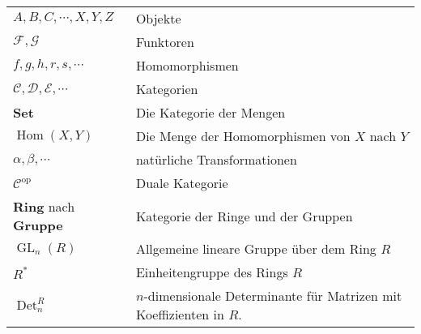 \documentclass[a4paper]{amsart}
\theoremstyle{definition}
\DeclareMathOperator{\Det}{Det}
\DeclareMathOperator{\Hom}{Hom}
\DeclareMathOperator{\GL}{GL}
\begin{document}
\begin{tabular}{ll}
    $A, B, C, \cdots, X, Y, Z$          & Objekte\\
    $\mathcal F,\mathcal G$             & Funktoren\\
    $f, g, h, r, s, \cdots$             & Homomorphismen\\
    $\mathcal C, \mathcal D, \mathcal E, \cdots$ & Kategorien\\
    \textbf{Set}                        & Die Kategorie der Mengen\\
    $\Hom( X, Y)$                       & Die Menge der Homomorphismen von $X$ nach $Y$\\
    $\alpha, \beta, \cdots$             & natürliche Transformationen\\
    $\mathcal C ^{\text{op}}$           & Duale Kategorie\\
    \textbf{Ring} nach \textbf{Gruppe}  & Kategorie der Ringe und der Gruppen\\
    $\GL_n(R)$                          & Allgemeine lineare Gruppe über dem Ring $R$\\
    $R^*$                               & Einheitengruppe des Rings $R$\\
    $\Det_n^R$                          & $n$-dimensionale Determinante für Matrizen mit Koeffizienten in $R$. 
    
\end{tabular}
\end{document}
